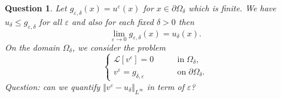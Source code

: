 \documentclass[11pt,reqno]{amsart}
\numberwithin{figure}{section}
\theoremstyle{plain}
\newtheorem{quest}{Question}
\theoremstyle{remark}
\numberwithin{equation}{section}
\begin{document}
\begin{quest} Let $g_{\varepsilon,\delta}(x) = u^\varepsilon(x)$ for $x\in \partial\Omega_\delta$ which is finite. We have $u_\delta\leq g_{\varepsilon,\delta}$ for all $\varepsilon$ and also for each fixed $\delta>0$ then
\begin{equation*}
    \lim_{\varepsilon\to 0} g_{\varepsilon,\delta}(x) = u_\delta(x).
\end{equation*}
On the domain $\Omega_\delta$, we consider the problem
\begin{equation*}
    \begin{cases}
    \mathcal{L}[v^\varepsilon] = 0 &\qquad\text{in}\;\Omega_\delta,\\
    v^\varepsilon = g_{\delta,\varepsilon} &\qquad\text{on}\;\partial\Omega_\delta.
    \end{cases}
\end{equation*}
Question: can we quantify $\Vert v^\varepsilon - u_\delta\Vert_{L^\infty}$ in term of $\varepsilon$?

\end{quest}
\end{document}
